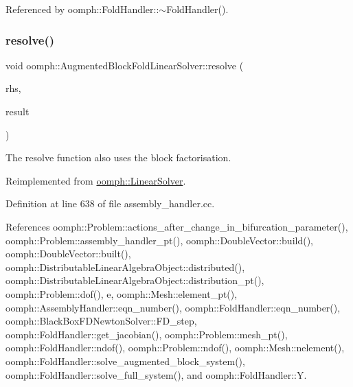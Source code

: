 Referenced by oomph\+::\+Fold\+Handler\+::$\sim$\+Fold\+Handler().

\mbox{\label{classoomph_1_1AugmentedBlockFoldLinearSolver_a7728fc74802b6802ed966765bc1e62d9}} 
\subsubsection{\texorpdfstring{resolve()}{resolve()}}
{\footnotesize\ttfamily void oomph\+::\+Augmented\+Block\+Fold\+Linear\+Solver\+::resolve (\begin{DoxyParamCaption}\item[{const \hyperlink{classoomph_1_1DoubleVector}{Double\+Vector} \&}]{rhs,  }\item[{\hyperlink{classoomph_1_1DoubleVector}{Double\+Vector} \&}]{result }\end{DoxyParamCaption})\hspace{0.3cm}{\ttfamily [virtual]}}



The resolve function also uses the block factorisation. 



Reimplemented from \hyperlink{classoomph_1_1LinearSolver_a3b310d08333033edc119b2a5bd7dcbfb}{oomph\+::\+Linear\+Solver}.



Definition at line 638 of file assembly\+\_\+handler.\+cc.



References oomph\+::\+Problem\+::actions\+\_\+after\+\_\+change\+\_\+in\+\_\+bifurcation\+\_\+parameter(), oomph\+::\+Problem\+::assembly\+\_\+handler\+\_\+pt(), oomph\+::\+Double\+Vector\+::build(), oomph\+::\+Double\+Vector\+::built(), oomph\+::\+Distributable\+Linear\+Algebra\+Object\+::distributed(), oomph\+::\+Distributable\+Linear\+Algebra\+Object\+::distribution\+\_\+pt(), oomph\+::\+Problem\+::dof(), e, oomph\+::\+Mesh\+::element\+\_\+pt(), oomph\+::\+Assembly\+Handler\+::eqn\+\_\+number(), oomph\+::\+Fold\+Handler\+::eqn\+\_\+number(), oomph\+::\+Black\+Box\+F\+D\+Newton\+Solver\+::\+F\+D\+\_\+step, oomph\+::\+Fold\+Handler\+::get\+\_\+jacobian(), oomph\+::\+Problem\+::mesh\+\_\+pt(), oomph\+::\+Fold\+Handler\+::ndof(), oomph\+::\+Problem\+::ndof(), oomph\+::\+Mesh\+::nelement(), oomph\+::\+Fold\+Handler\+::solve\+\_\+augmented\+\_\+block\+\_\+system(), oomph\+::\+Fold\+Handler\+::solve\+\_\+full\+\_\+system(), and oomph\+::\+Fold\+Handler\+::Y.

